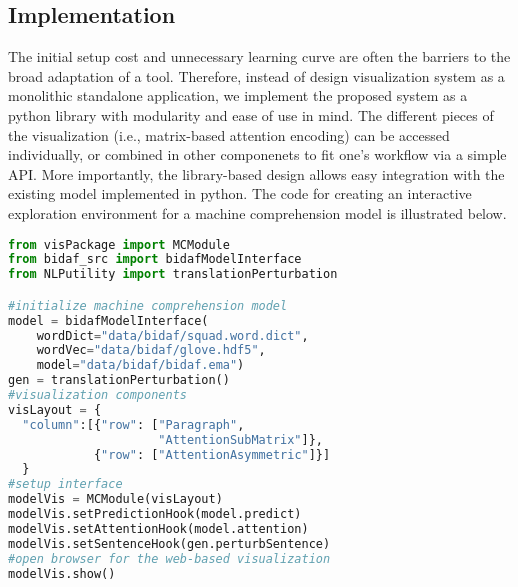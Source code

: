\subsection{Implementation}
The initial setup cost and unnecessary learning curve are often the barriers to the broad adaptation of a tool. 
Therefore, instead of design visualization system as a monolithic standalone application, 
we implement the proposed system as a python library with modularity and ease of use in mind.
The different pieces of the visualization (i.e., matrix-based attention encoding) can be accessed individually, 
or combined in other componenets to fit one's workflow via a simple API.
More importantly, the library-based design allows easy integration with the existing model implemented in python.
The code for creating an interactive exploration environment for a machine comprehension model is illustrated below.

\begin{lstlisting}[language=Python, caption=Code for setting up the visualization system shown in Figure~\ref{fig:MCexample}(a).]
from visPackage import MCModule
from bidaf_src import bidafModelInterface
from NLPutility import translationPerturbation

#initialize machine comprehension model
model = bidafModelInterface(
    wordDict="data/bidaf/squad.word.dict",
    wordVec="data/bidaf/glove.hdf5",
    model="data/bidaf/bidaf.ema")
gen = translationPerturbation()
#visualization components
visLayout = {
  "column":[{"row": ["Paragraph", 
                     "AttentionSubMatrix"]},
            {"row": ["AttentionAsymmetric"]}]
  }
#setup interface
modelVis = MCModule(visLayout)
modelVis.setPredictionHook(model.predict)
modelVis.setAttentionHook(model.attention)
modelVis.setSentenceHook(gen.perturbSentence)
#open browser for the web-based visualization
modelVis.show()
\end{lstlisting}




